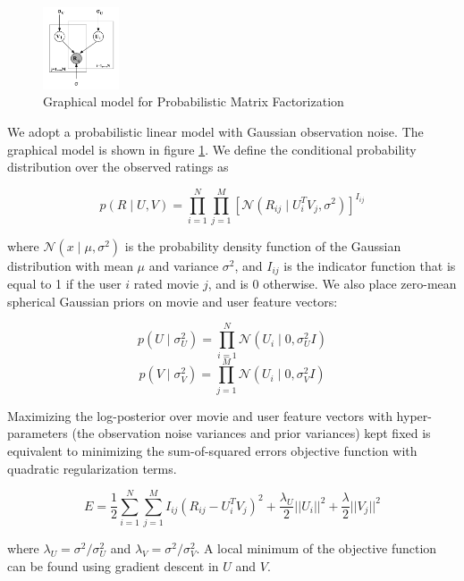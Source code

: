 \documentclass{article} %
\begin{document}
\begin{figure}[ht]
\centering
\includegraphics[width=0.2\textwidth]{pmf_graphical_model.png}
\caption{Graphical model for Probabilistic Matrix Factorization}
\label{fig:pmf_gm}
\end{figure}

We adopt a probabilistic linear model with Gaussian observation noise. The graphical model is shown in figure \ref{fig:pmf_gm}. We define the conditional probability distribution over the observed ratings as

\begin{equation}
p(R \mid U, V) = \prod_{i=1}^N \prod_{j=1}^M [\mathcal{N} (R_{ij} \mid U_i^T V_j, \sigma^2)]^{I_{ij}}
\end{equation}

where $\mathcal{N}(x \mid \mu, \sigma^2)$ is the probability density function of the Gaussian distribution with mean $\mu$ and variance $\sigma^2$, and $I_{ij}$ is the indicator function that is equal to 1 if the user $i$ rated movie $j$, and is 0 otherwise. We also place zero-mean spherical Gaussian priors on movie and user feature vectors:

\begin{equation}
p(U \mid \sigma_U^2) = \prod_{i=1}^N \mathcal{N}(U_i \mid 0, \sigma_U^2 I)
\end{equation}
\begin{equation}
p(V \mid \sigma_V^2) = \prod_{j=1}^M \mathcal{N}(U_i \mid 0, \sigma_V^2 I)
\end{equation}

Maximizing the log-posterior over movie and user feature vectors with hyper-parameters (the observation noise variances and prior variances) kept fixed is equivalent to minimizing the sum-of-squared errors objective function with quadratic regularization terms.

\begin{equation}
E = \frac{1}{2} \sum_{i=1}^N \sum_{j=1}^M I_{ij}(R_{ij} - U_i^T V_j)^2 + \frac{\lambda_U}{2} || U_i ||^2 + \frac{\lambda}{2} ||V_j||^2 
\end{equation}

where $\lambda_U = \sigma^2/\sigma_U^2$ and $\lambda_V = \sigma^2/\sigma_V^2$. A local minimum of the objective function can be found using gradient descent in $U$ and $V$.
\end{document}
